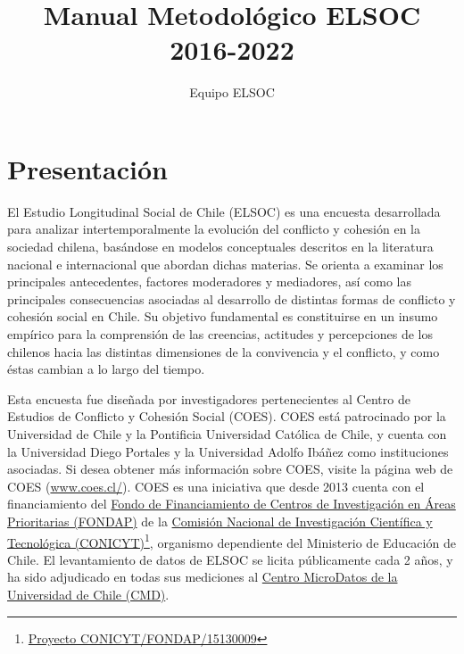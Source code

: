\documentclass[
  12pt,
]{article}
\title{Manual Metodológico ELSOC 2016-2022}
\author{Equipo ELSOC}
\date{}
\begin{document}
\maketitle

{
\hypersetup{linkcolor=}
\setcounter{tocdepth}{1}
\tableofcontents
}
\listoffigures
\listoftables
{}
\hypertarget{presentaciuxf3n}{%
\section*{Presentación}\label{presentaciuxf3n}}

El Estudio Longitudinal Social de Chile (ELSOC) es una encuesta desarrollada para analizar intertemporalmente la evolución del conflicto y cohesión en la sociedad chilena, basándose en modelos conceptuales descritos en la literatura nacional e internacional que abordan dichas materias. Se orienta a examinar los principales antecedentes, factores moderadores y mediadores, así como las principales consecuencias asociadas al desarrollo de distintas formas de conflicto y cohesión social en Chile. Su objetivo fundamental es constituirse en un insumo empírico para la comprensión de las creencias, actitudes y percepciones de los chilenos hacia las distintas dimensiones de la convivencia y el conflicto, y como éstas cambian a lo largo del tiempo.

Esta encuesta fue diseñada por investigadores pertenecientes al Centro de Estudios de Conflicto y Cohesión Social (COES). COES está patrocinado por la Universidad de Chile y la Pontificia Universidad Católica de Chile, y cuenta con la Universidad Diego Portales y la Universidad Adolfo Ibáñez como instituciones asociadas. Si desea obtener más información sobre COES, visite la página web de COES (\url{www.coes.cl/}). COES es una iniciativa que desde 2013 cuenta con el financiamiento del \href{https://www.conicyt.cl/fondap/centros-fondap/}{Fondo de Financiamiento de Centros de Investigación en Áreas Prioritarias (FONDAP)} de la \href{https://www.conicyt.cl/}{Comisión Nacional de Investigación Científica y Tecnológica (CONICYT)}\footnote{\href{https://www.conicyt.cl/fondap/centros-fondap/centros-en-ejecucion/coes/}{Proyecto CONICYT/FONDAP/15130009}}, organismo dependiente del Ministerio de Educación de Chile. El levantamiento de datos de ELSOC se licita públicamente cada 2 años, y ha sido adjudicado en todas sus mediciones al \href{https://www.microdatos.cl/}{Centro MicroDatos de la Universidad de Chile (CMD)}.
\end{document}

